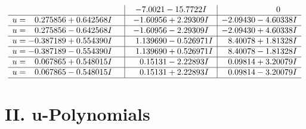 \documentclass[1p]{elsarticle_modified}
\theoremstyle{definition}
\begin{document}
$$\begin{array}{c|c|c}
 & -7.0021 - 15.7722 I & \phantom{-0.000000 } 0 \\ \hline\begin{aligned}
u &= \phantom{-}0.275856 + 0.642568 I\end{aligned}
 & -1.60956 + 2.29309 I & -2.09430 - 4.60338 I \\ \hline\begin{aligned}
u &= \phantom{-}0.275856 - 0.642568 I\end{aligned}
 & -1.60956 - 2.29309 I & -2.09430 + 4.60338 I \\ \hline\begin{aligned}
u &= -0.387189 + 0.554390 I\end{aligned}
 & \phantom{-}1.139690 - 0.526971 I & \phantom{-}8.40078 + 1.81328 I \\ \hline\begin{aligned}
u &= -0.387189 - 0.554390 I\end{aligned}
 & \phantom{-}1.139690 + 0.526971 I & \phantom{-}8.40078 - 1.81328 I \\ \hline\begin{aligned}
u &= \phantom{-}0.067865 + 0.548015 I\end{aligned}
 & \phantom{-}0.15131 - 2.22893 I & \phantom{-}0.09814 + 3.20079 I \\ \hline\begin{aligned}
u &= \phantom{-}0.067865 - 0.548015 I\end{aligned}
 & \phantom{-}0.15131 + 2.22893 I & \phantom{-}0.09814 - 3.20079 I\\
 \hline 
 \end{array}$$\newpage
\newpage\renewcommand{\arraystretch}{1}
\centering \section*{ II. u-Polynomials}
\end{document}
